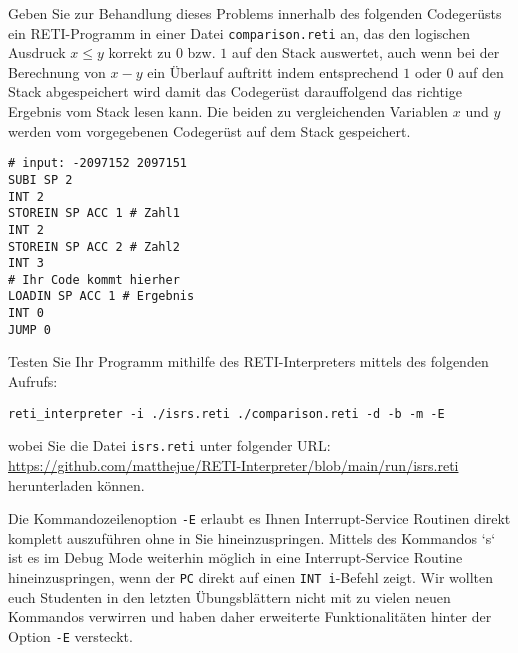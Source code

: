 \documentclass{article}
\begin{document}
Geben Sie zur Behandlung dieses Problems innerhalb des folgenden Codegerüsts ein RETI-Programm in einer Datei \verb|comparison.reti| an, das den logischen Ausdruck $x \le y$ korrekt zu $0$ bzw. $1$ auf den Stack auswertet, auch wenn bei der Berechnung von $x - y$ ein Überlauf auftritt indem entsprechend $1$ oder $0$ auf den Stack abgespeichert wird damit das Codegerüst darauffolgend das richtige Ergebnis vom Stack lesen kann. Die beiden zu vergleichenden Variablen $x$ und $y$ werden vom vorgegebenen Codegerüst auf dem Stack gespeichert. %

\begin{verbatim}
# input: -2097152 2097151
SUBI SP 2
INT 2
STOREIN SP ACC 1 # Zahl1
INT 2
STOREIN SP ACC 2 # Zahl2
INT 3
# Ihr Code kommt hierher
LOADIN SP ACC 1 # Ergebnis
INT 0
JUMP 0
\end{verbatim}

Testen Sie Ihr Programm mithilfe des RETI-Interpreters mittels des folgenden Aufrufs:

\begin{verbatim}
reti_interpreter -i ./isrs.reti ./comparison.reti -d -b -m -E
\end{verbatim}

wobei Sie die Datei \verb|isrs.reti| unter folgender URL: \href{https://github.com/matthejue/RETI-Interpreter/blob/main/run/isrs.reti}{https://github.com/matthejue/RETI-Interpreter/blob/main/run/isrs.reti} herunterladen können.

Die Kommandozeilenoption \verb|-E| erlaubt es Ihnen Interrupt-Service Routinen direkt komplett auszuführen ohne in Sie hineinzuspringen. Mittels des Kommandos `s` ist es im Debug Mode weiterhin möglich in eine Interrupt-Service Routine hineinzuspringen, wenn der \verb|PC| direkt auf einen \verb|INT i|-Befehl zeigt. Wir wollten euch Studenten in den letzten Übungsblättern nicht mit zu vielen neuen Kommandos verwirren und haben daher erweiterte Funktionalitäten hinter der Option \verb|-E| versteckt.
\end{document}
